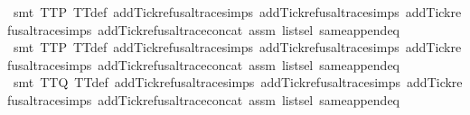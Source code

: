 \begin{isabellebody}
\ {\isacharparenleft}smt\ TT{}{\isacharunderscore}P\ TT{}{\isacharunderscore}def\ add{\isacharunderscore}Tick{\isacharunderscore}refusal{\isacharunderscore}trace{\isachardot}simps{\isacharparenleft}{}{\isacharparenright}\ add{\isacharunderscore}Tick{\isacharunderscore}refusal{\isacharunderscore}trace{\isachardot}simps{\isacharparenleft}{}{\isacharparenright}\ add{\isacharunderscore}Tick{\isacharunderscore}refusal{\isacharunderscore}trace{\isachardot}simps{\isacharparenleft}{}{\isacharparenright}\ add{\isacharunderscore}Tick{\isacharunderscore}refusal{\isacharunderscore}trace{\isacharunderscore}concat\ assm{}\ list{\isachardot}sel{\isacharparenleft}{}{\isacharparenright}\ same{\isacharunderscore}append{\isacharunderscore}eq{\isacharparenright}\isanewline
\ \ \ \ \isamarkupfalse%
\ {\isacharparenleft}smt\ TT{}{\isacharunderscore}P\ TT{}{\isacharunderscore}def\ add{\isacharunderscore}Tick{\isacharunderscore}refusal{\isacharunderscore}trace{\isachardot}simps{\isacharparenleft}{}{\isacharparenright}\ add{\isacharunderscore}Tick{\isacharunderscore}refusal{\isacharunderscore}trace{\isachardot}simps{\isacharparenleft}{}{\isacharparenright}\ add{\isacharunderscore}Tick{\isacharunderscore}refusal{\isacharunderscore}trace{\isachardot}simps{\isacharparenleft}{}{\isacharparenright}\ add{\isacharunderscore}Tick{\isacharunderscore}refusal{\isacharunderscore}trace{\isacharunderscore}concat\ assm{}\ list{\isachardot}sel{\isacharparenleft}{}{\isacharparenright}\ same{\isacharunderscore}append{\isacharunderscore}eq{\isacharparenright}\isanewline
\ \ \ \ \isamarkupfalse%
\ {\isacharparenleft}smt\ TT{}{\isacharunderscore}Q\ TT{}{\isacharunderscore}def\ add{\isacharunderscore}Tick{\isacharunderscore}refusal{\isacharunderscore}trace{\isachardot}simps{\isacharparenleft}{}{\isacharparenright}\ add{\isacharunderscore}Tick{\isacharunderscore}refusal{\isacharunderscore}trace{\isachardot}simps{\isacharparenleft}{}{\isacharparenright}\ add{\isacharunderscore}Tick{\isacharunderscore}refusal{\isacharunderscore}trace{\isachardot}simps{\isacharparenleft}{}{\isacharparenright}\ add{\isacharunderscore}Tick{\isacharunderscore}refusal{\isacharunderscore}trace{\isacharunderscore}concat\ assm{}\ list{\isachardot}sel{\isacharparenleft}{}{\isacharparenright}\ same{\isacharunderscore}append{\isacharunderscore}eq{\isacharparenright}\isanewline

\end{isabellebody}
